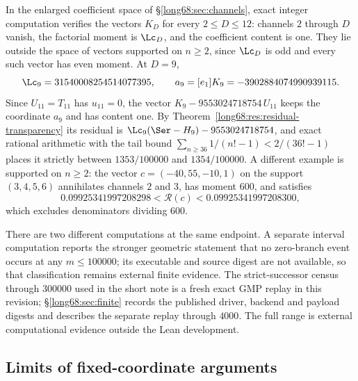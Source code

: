 In the enlarged coefficient space of \S\ref{long68:sec:channels}, exact
integer computation verifies the vectors $K_D$ for every $2\le D\le12$:
channels $2$ through $D$ vanish, the factorial moment is $\Lc_D$, and the
coefficient content is one.  They lie outside the space of vectors supported
on $n\ge2$, since $\Lc_D$ is odd and every such vector has even moment.  At
$D=9$,
\[
 \Lc_9=31540008254514077395,\qquad a_9=[e_1]K_9=-3902884074990939115 .
\]
Since $U_{11}=T_{11}$ has $u_{11}=0$, the vector $K_9-9553024718754\,U_{11}$
keeps the coordinate $a_9$ and has content one.  By
Theorem~\ref{long68:res:residual-transparency} its residual is
$\Lc_9(\Ser-H_9)-9553024718754$, and exact rational arithmetic with the tail
bound $\sum_{n\ge36}1/(n!-1)<2/(36!-1)$ places it strictly between
$1353/100000$ and $1354/100000$.  A different example is supported on
$n\ge2$: the vector $c=(-40,55,-10,1)$ on the support $(3,4,5,6)$ annihilates
channels $2$ and $3$, has moment $600$, and satisfies
\[
 0.09925341997208298<\mathcal R(c)<0.09925341997208300 ,
\]
which excludes denominators dividing $600$.

There are two different computations at the same endpoint.  A separate
interval computation reports the stronger geometric statement that no
zero-branch event occurs at any $m\le100000$; its executable and source
digest are not available, so that classification remains external finite
evidence.  The strict-successor census through $300000$ used in the short
note is a fresh exact GMP replay in this revision; \S\ref{long68:sec:finite}
records the published driver, backend and payload digests and describes the
separate replay through $4000$.  The full range is external
computational evidence outside the Lean development.

\subsection{Limits of fixed-coordinate arguments}\label{long68:sec:ext-nogo}

